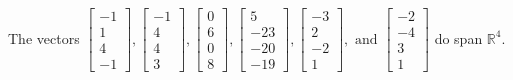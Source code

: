 \begin{exercise}
\begin{exerciseStatement}
  \end{exerciseStatement}
  \begin{exerciseAnswer}
   The vectors \(\left[\begin{array}{r}
-1 \\
1 \\
4 \\
-1
\end{array}\right] , \left[\begin{array}{r}
-1 \\
4 \\
4 \\
3
\end{array}\right] , \left[\begin{array}{r}
0 \\
6 \\
0 \\
8
\end{array}\right] , \left[\begin{array}{r}
5 \\
-23 \\
-20 \\
-19
\end{array}\right] , \left[\begin{array}{r}
-3 \\
2 \\
-2 \\
1
\end{array}\right] , \text{ and } \left[\begin{array}{r}
-2 \\
-4 \\
3 \\
1
\end{array}\right]\) 
  	 do  
	span \(\mathbb{R}^4\).
  


  \end{exerciseAnswer}
\end{exercise}